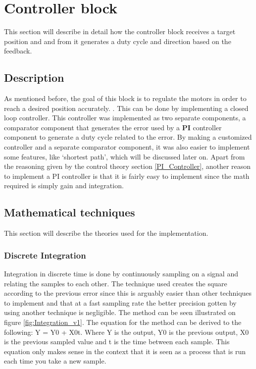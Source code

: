 \section{Controller block}
This section will describe in detail how the controller block receives a target position and and from it generates a duty cycle and direction based on the feedback.


\subsection{Description}

As mentioned before, the goal of this block is to regulate the motors in order to reach a desired position accurately. . This can be done by implementing a closed loop controller. This controller was implemented as two separate components, a comparator component that generates the error used by a \textbf{PI} controller component to generate a duty cycle related to the error. By making a customized controller and a separate comparator component, it was also easier to implement some features, like ‘shortest path’, which will be discussed later on. 
Apart from the reasoning given by the control theory section \ref{PI_Controller}, another reason to implement a PI controller is that it is fairly easy to implement since the math required is simply gain and integration.


\subsection{Mathematical techniques}

This section will describe the theories used for the implementation.


\subsubsection{Discrete Integration}

Integration in discrete time is done by continuously sampling on a signal and relating the samples to each other. The technique used creates the square according to the previous error since this is arguably easier than other techniques to implement and that at a fast sampling rate the better precision gotten by using another technique is negligible. The method can be seen illustrated on figure \ref{fig:Integration_v1}.
The equation for the method can be derived to the following: Y = Y0 + X0t. Where Y is the output, Y0 is the previous output, X0 is the previous sampled value and t is the time between each sample. This equation only makes sense in the context that it is seen as a process that is run each time you take a new sample.


